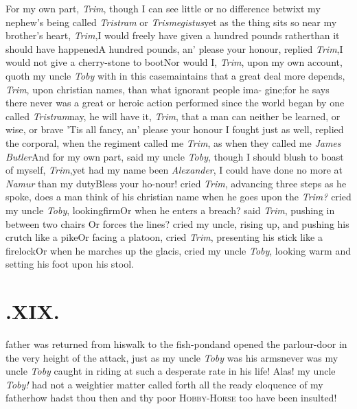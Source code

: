 \documentclass{article}
\begin{document}
\tsh For my own part, \textit{Trim}, though I can see
little or no difference betwixt my nephew’s being called \textit{Tristram} or
\textit{Trisme\-gistus}\tsk yet as the thing sits so near my
brother’s heart, \textit{Trim},\tsh I would freely have
given a hundred pounds rather\break than it should have
happened\tsk A hun\-dred pounds, an’ please your
honour,  re\-plied \textit{Trim},\tsk I would not give a cherry-stone
to boot\tsk Nor would I, \textit{Trim}, upon my own
account, quoth my uncle \textit{Toby}\tsk
{}
with in this case\tsk maintains that a
great deal more depends, \textit{Trim}, upon christian names, than
what ignorant people ima- gine;\tsh for he says there never
was a great or heroic action performed since the world began by one
called \textit{Tristram}\break\tsk nay, he will have it, \textit{Trim},
that a man can neither be learned, or wise, or
brave\break
\tsk ’Tis all fancy, an’ please your honour\break
\tsk I fought just as well, replied the corporal, when the
regiment called me \textit{Trim}, as when they called me \textit{James
Butler}\tsh\break And for my own part, said my uncle\break
\textit{Toby}, though I should blush to boast of myself,
\textit{Trim},\tsk yet had my name been \textit{Alexander}, I could have done no more at
\textit{Namur} than my duty\tsk Bless your ho-\break nour! cried
\textit{Trim}, advancing three steps as he spoke, does a man think of
his christian name when he goes upon the  \textit{Trim?} cried my uncle
\textit{Toby}, looking\break firm\tsk Or when he enters a breach?
said \textit{Trim}, pushing in between two chairs\tsk{}
\tsk Or forces the lines? cried my uncle, rising up, and pushing his crutch
like a pike\tsk Or facing a platoon, cried \textit{Trim},
presenting his stick like a firelock\tsk Or when he
marches up the glacis, cried my uncle \textit{Toby}, looking warm and
setting his foot upon his stool.\tsh

\vspace\parskip

\section{.\enspace XIX.}

 father was returned from his\break walk
to the fish-pond\tsk and open\-ed the parlour-door in the
very height of the attack, just as my uncle \textit{Toby} was
 his
arms\tsk never was my uncle \textit{Toby} caught in riding at such a
desperate rate in his life! Alas! my uncle \textit{Toby!} had not a
weightier matter called forth all the ready eloquence of my
father\tsk how hadst
thou then and thy poor
\textsc{Hobby-Horse} too have been insulted!
\end{document}
